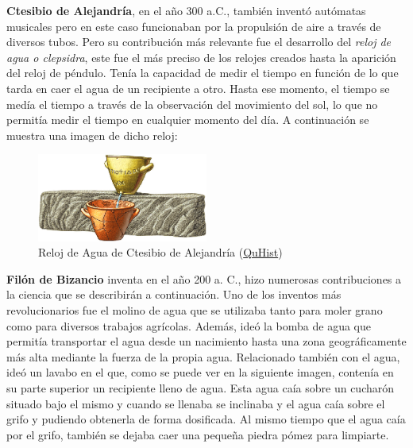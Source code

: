 \textbf{Ctesibio de Alejandría}, en el año 300 a.C., también inventó autómatas musicales pero en este caso funcionaban por la propulsión de aire a través de diversos tubos. Pero su contribución más relevante fue el desarrollo del \textit{reloj de agua o clepsidra}, este fue el más preciso de los relojes creados hasta la aparición del reloj de péndulo. Tenía la capacidad de medir el tiempo en función de lo que tarda en caer el agua de un recipiente a otro. Hasta ese momento, el tiempo se medía el tiempo a través de la observación del movimiento del sol, lo que no permitía medir el tiempo en cualquier momento del día. A continuación se muestra una imagen de dicho reloj:\\


\begin{figure}[H]
\begin{center}
  \includegraphics[width=0.5\textwidth]{./EtapaPrimeriza/imagenes/reloj.png}
  \caption{Reloj de Agua de Ctesibio de Alejandría (\href{http://quhist.com/origen-a-lo-largo-historia-termino-clepsidra/}{QuHist})}
  \label{reloj}
\end{center}
\end{figure}



\textbf{Filón de Bizancio} inventa en el año 200 a. C., hizo numerosas contribuciones a la ciencia que se describirán a continuación. Uno de los inventos más revolucionarios fue el molino de agua que se utilizaba tanto para moler grano como para diversos trabajos agrícolas. Además, ideó la bomba de agua que permitía transportar el agua desde un nacimiento hasta una zona geográficamente más alta mediante la fuerza de la propia agua. Relacionado también con el agua, ideó un lavabo en el que, como se puede ver en la siguiente imagen, contenía en su parte superior un recipiente lleno de agua. Esta agua caía sobre un cucharón situado bajo el mismo y cuando se llenaba se inclinaba y el agua caía sobre el grifo y pudiendo obtenerla de forma dosificada. Al mismo tiempo que el agua caía por el grifo, también se dejaba caer una pequeña piedra pómez para limpiarte.\\


